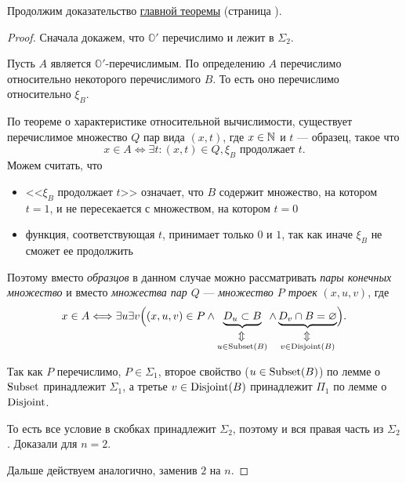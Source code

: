 \noindent
Продолжим доказательство \hyperref[thm:main_thm]{главной теоремы} (страница \pageref{thm:main_thm}).
\begin{proof}\label{proof:main_thm}
	Сначала докажем, что $ \mathbb{O}'$ перечислимо и лежит в  $ \Sigma_2$.

	Пусть  $ A$ является $ \mathbb{O}'$-перечислимым. По определению $ A $ перечислимо относительно некоторого перечислимого $ B$. То есть оно перечислимо относительно  $ \xi_B$.

	По теореме о характеристике относительной вычислимости, существует перечислимое множество $ Q$ пар вида $ (x, t)$,  где $ x \in \mathbb{N}$ и $ t$ --- образец, такое что 
	\[
		x \in A \Longleftrightarrow \exists t \colon (x, t) \in Q, \xi_B \text{ продолжает } t
	.\] 
	Можем считать, что
	\begin{itemize}
		\item  <<$ \xi_B$ продолжает $ t$>> означает, что $ B$ содержит множество, на котором  $ t = 1$, и не пересекается с множеством, на котором  $ t = 0$
		\item функция, соответствующая $ t$, принимает только $ 0$ и $ 1$, так как иначе $ \xi_B$ не сможет ее продолжить
	\end{itemize}
	Поэтому вместо \textit{образцов} в данном случае можно рассматривать \textit{пары конечных множество} и вместо \textit{множества пар $ Q$} --- \textit{множество $ P$ троек} $ (x, u, v)$, где 
	\[
		x \in A \Longleftrightarrow \exists u \exists v \Bigl( (x, u,v) \in P \wedge
			\underbrace{D_u \subset B}_{\stackrel{\rotatebox[origin=c]{90}{$\Leftrightarrow$}}{u \in \Subsetm(B)}} \wedge 
		\underbrace{D_v \cap B = \varnothing}_{\stackrel{\rotatebox[origin=c]{90}{$\Leftrightarrow$}}{v \in  \Disjointm(B)}} \Bigr) 
	.\] 

	Так как $ P$ перечислимо,  $ P \in \Sigma_1$, второе свойство ($u \in  \operatorname{Subset}(B)$) по лемме о $ \operatorname{Subset}$ принадлежит  $ \Sigma_1$, а третье  $ v \in \operatorname{Disjoint}(B)$ принадлежит $ \Pi_1$ по лемме о \ $ \operatorname{Disjoint}$.

	То есть все условие в скобках принадлежит  $ \Sigma_2$, поэтому и вся правая часть из  $ \Sigma_2$.  Доказали для  $ n = 2$.
	
	Дальше действуем аналогично, заменив  $ 2$ на  $ n$.
\end{proof}

